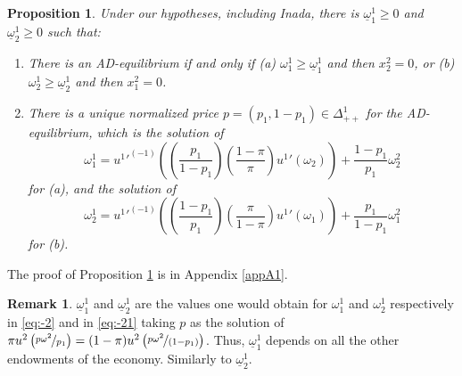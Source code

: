 \documentclass[pdftex]{article}
\numberwithin{equation}{section}
\theoremstyle{th}
\newtheorem{prop}{{Proposition}}%
\newtheorem{proof lemma}{{Proof Lemma}.}
\theoremstyle{definition}
\newtheorem{remark}{Remark}%
\begin{document}
\begin{prop}
\label{prop1}
Under our hypotheses, including Inada, there is $\underline{\omega}_1^1\geq0$ and $\underline{\omega}_2^1\geq0$ such that:
\begin{enumerate}
\item There is an AD-equilibrium if and only if (a) $\omega_1^1\geq\underline{\omega}_1^1$ and then $x_2^2=0$, or (b) $\omega_2^1\geq\underline{\omega}_2^1$ and then $x_1^2=0$. 

\item There is a unique normalized price $p=(p_1,1-p_1)\in\Delta_{++}^1$ for the AD-equilibrium, which is the solution of
\begin{equation}
\label{eq:-2}
\omega_1^1={{u^1}'}^{(-1)}\left(\left(\frac{p_1}{1-p_1}\right)\left(\frac{1-\pi}{\pi}\right){u^1}'\left(\omega_2\right)\right)+\frac{1-p_1}{p_1}\omega_2^2
\end{equation}
for (a), and the solution of
\begin{equation}
\label{eq:-21}
\omega_2^1={{u^1}'}^{(-1)}\left(\left(\frac{1-p_1}{p_1}\right)\left(\frac{\pi}{1-\pi}\right){u^1}'\left(\omega_1\right)\right)+\frac{p_1}{1-p_1}\omega_1^2
\end{equation}
for (b).
\end{enumerate}
\end{prop}
The proof of Proposition \ref{prop1} is in Appendix \ref{appA1}.


\begin{remark}
$\underline{\omega}_1^1$ and $\underline{\omega}_2^1$ are the values one would obtain for $\omega_1^1$ and $\omega_2^1$ respectively in \ref{eq:-2} and in \ref{eq:-21} taking $p$ as the solution of $\pi{u}^2\left(\nicefrac{p\omega^2}{p_1}\right)=(1-\pi)u^2\left(\nicefrac{p\omega^2}{(1-p_1)}\right)$.
Thus, $\underline{\omega}^1_1$ depends on all the other endowments of the economy. Similarly to $\underline{\omega}^1_2$.
\end{remark}
\end{document}
